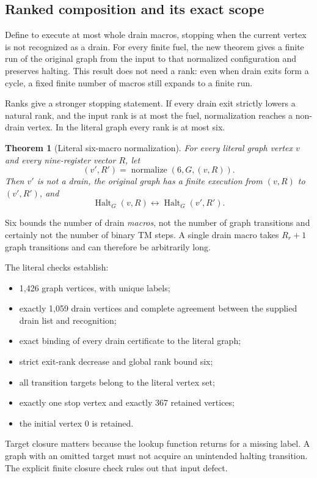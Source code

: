 \documentclass[11pt]{article}
\newtheorem{theorem}{Theorem}[section]
\newcommand{\Halt}{\operatorname{Halt}}
\newcommand{\code}[1]{\texttt{\detokenize{#1}}}
\begin{document}
\subsection{Ranked composition and its exact scope}

Define \code{normalize fuel G (v,R)} to execute at most \code{fuel} whole drain macros, stopping when the current vertex is not recognized as a drain. For every finite fuel, the new theorem gives a finite run of the original graph from the input to that normalized configuration and preserves halting. This result does not need a rank: even when drain exits form a cycle, a fixed finite number of macros still expands to a finite run.

Ranks give a stronger stopping statement. If every drain exit strictly lowers a natural rank, and the input rank is at most the fuel, normalization reaches a non-drain vertex. In the literal graph every rank is at most six.

\begin{theorem}[Literal six-macro normalization]
For every literal graph vertex $v$ and every nine-register vector $R$, let
\[
 (v',R')=\operatorname{normalize}(6,G,(v,R)).
\]
Then $v'$ is not a drain, the original graph has a finite execution from $(v,R)$ to $(v',R')$, and
\[
 \Halt_G(v,R)\leftrightarrow\Halt_G(v',R').
\]
\end{theorem}
Six bounds the number of drain \emph{macros}, not the number of graph transitions and certainly not the number of binary TM steps. A single drain macro takes $R_r+1$ graph transitions and can therefore be arbitrarily long.

The literal checks establish:
\begin{itemize}
\item 1,426 graph vertices, with unique labels;
\item exactly 1,059 drain vertices and complete agreement between the supplied drain list and recognition;
\item exact binding of every drain certificate to the literal graph;
\item strict exit-rank decrease and global rank bound six;
\item all transition targets belong to the literal vertex set;
\item exactly one stop vertex and exactly 367 retained vertices;
\item the initial vertex 0 is retained.
\end{itemize}
Target closure matters because the lookup function returns \code{Stop} for a missing label. A graph with an omitted target must not acquire an unintended halting transition. The explicit finite closure check rules out that input defect.
\end{document}
